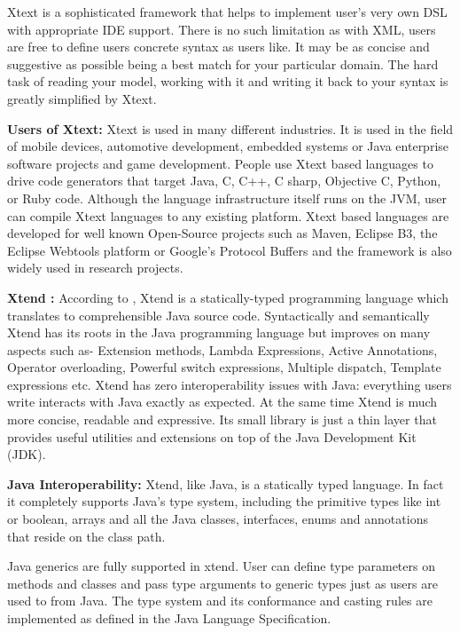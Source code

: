 	Xtext is a sophisticated framework that helps to implement user's very own DSL with appropriate IDE support. There is no such limitation as with XML, users are free to define users concrete syntax as users like. It may be as concise and suggestive as possible being a best match for your particular domain. The hard task of reading your model, working with it and writing it back to your syntax is greatly simplified by Xtext.
	
	\textbf{Users of Xtext:}
	Xtext is used in many different industries. It is used in the field of mobile devices, automotive development, embedded systems or Java enterprise software projects and game development. People use Xtext based languages to drive code generators that target Java, C, C++, C sharp, Objective C, Python, or Ruby code. Although the language infrastructure itself runs on the JVM, user can compile Xtext languages to any existing platform. Xtext based languages are developed for well known Open-Source projects such as Maven, Eclipse B3, the Eclipse Webtools platform or Google's Protocol Buffers and the framework is also widely used in research projects.
	
\textbf{ Xtend :} According to \cite{ref_20_xtend}, Xtend is a statically-typed programming language which translates to comprehensible Java source code. Syntactically and semantically Xtend has its roots in the Java programming language but improves on many aspects such as- Extension methods, Lambda Expressions, Active Annotations, Operator overloading, Powerful switch expressions, Multiple dispatch, Template expressions etc. Xtend has zero interoperability issues with Java: everything users write interacts with Java exactly as expected. At the same time Xtend is much more concise, readable and expressive. Its small library is just a thin layer that provides useful utilities and extensions on top of the Java Development Kit (JDK). 
	
	\textbf{Java Interoperability:}
	Xtend, like Java, is a statically typed language. In fact it completely supports Java's type system, including the primitive types like int or boolean, arrays and all the Java classes, interfaces, enums and annotations that reside on the class path.
	
	Java generics are fully supported in xtend. User can define type parameters on methods and classes and pass type arguments to generic types just as users are used to from Java. The type system and its conformance and casting rules are implemented as defined in the Java Language Specification.
	
